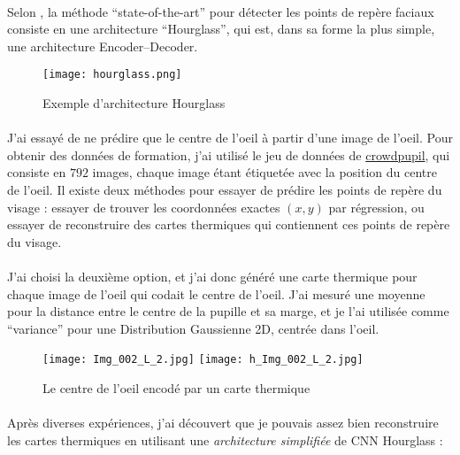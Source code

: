 \paragraph{}
Selon \cite{paper_stacked_hourglass}, la méthode ``state-of-the-art'' pour détecter les points de repère faciaux consiste en une architecture ``Hourglass'', qui est, dans sa forme la plus simple, une architecture Encoder–Decoder.

\begin{figure}[h]
    \centering
    \texttt{[image: hourglass.png]}
    \caption{Exemple d'architecture Hourglass}
\end{figure}

\paragraph{}
J'ai essayé de ne prédire que le centre de l'oeil à partir d'une image de l'oeil.
Pour obtenir des données de formation, j'ai utilisé le jeu de données de \href{http://cs.uef.fi/pupoint/}{crowdpupil}, qui consiste en $792$ images, chaque image étant étiquetée avec la position du centre de l'oeil.
Il existe deux méthodes pour essayer de prédire les points de repère du visage : essayer de trouver les coordonnées exactes $(x, y)$ par régression, ou essayer de reconstruire des cartes thermiques qui contiennent ces points de repère du visage.

\paragraph{}
J'ai choisi la deuxième option, et j'ai donc généré une carte thermique pour chaque image de l'oeil qui codait le centre de l'oeil.
J'ai mesuré une moyenne pour la distance entre le centre de la pupille et sa marge, et je l'ai utilisée comme ``variance'' pour une Distribution Gaussienne 2D, centrée dans l'oeil.

\begin{figure}[H]
    \centering
    \texttt{[image: Img\_002\_L\_2.jpg]}
    \texttt{[image: h\_Img\_002\_L\_2.jpg]}
    \caption{Le centre de l'oeil encodé par un carte thermique}
\end{figure}

\clearpage

\paragraph{}
Après diverses expériences, j'ai découvert que je pouvais assez bien reconstruire les cartes thermiques en utilisant une \emph{architecture simplifiée} de CNN Hourglass :

